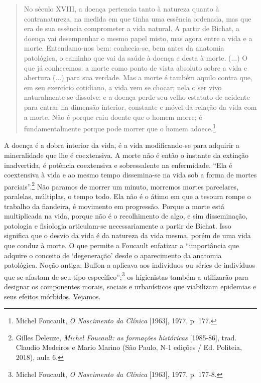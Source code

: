 \begin{quote}
No século XVIII, a doença pertencia tanto à natureza quanto à
contranatureza, na medida em que tinha uma essência ordenada, mas que
era de sua essência comprometer a vida natural. A partir de Bichat, a
doença vai desempenhar o mesmo papel misto, mas agora entre a vida e a
morte. Entendamo-nos bem: conhecia-se, bem antes da anatomia patológica,
o caminho que vai da saúde à doença e desta à morte. (...) O que já
conhecemos: a morte como ponto de vista absoluto sobre a vida e abertura
(...) para sua verdade. Mas a morte é também aquilo contra que, em seu
exercício cotidiano, a vida vem se chocar; nela o ser vivo naturalmente
se dissolve: e a doença perde seu velho estatuto de acidente para entrar
na dimensão interior, constante e móvel da relação da vida com a morte.
Não é porque caiu doente que o homem morre; é fundamentalmente porque
pode morrer que o homem adoece.\footnote{Michel Foucault, \emph{O
  Nascimento da Clínica} {[}1963{]}, 1977, p. 177.}
\end{quote}

A doença é a dobra interior da vida, é a vida modificando-se para
adquirir a mineralidade que lhe é coextensiva. A morte não é então o
instante da extinção inadvertida, é potência coextensiva e sobressalente
na enfermidade. ``Ela é coextensiva à vida e ao mesmo tempo dissemina-se
na vida sob a forma de mortes parciais''.\footnote{Gilles Deleuze,
  \emph{Michel Foucault: as formações históricas} {[}1985-86{]}, trad.
  Claudio Medeiros e Mario Marino (São Paulo, N-1 edições / Ed.
  Politeia, 2018), aula 6.} Não paramos de morrer um minuto, morremos
mortes parcelares, paralelas, múltiplas, o tempo todo. Ela não é o átimo
em que a tesoura rompe o trabalho da fiandeira, é movimento em
progressão. Porque a morte está multiplicada na vida, porque não é o
recolhimento de algo, e sim disseminação, patologia e fisiologia
articulam-se necessariamente a partir de Bichat. Isso significa que o
desvio da vida é da natureza da vida mesma, porém de uma vida que conduz
à morte. O que permite a Foucault enfatizar a ``importância que adquire
o conceito de `degeneração' desde o aparecimento da anatomia patológica.
Noção antiga: Buffon a aplicava aos indivíduos ou séries de indivíduos
que se afastam de seu tipo específico'';\footnote{Michel Foucault,
  \emph{O Nascimento da Clínica} {[}1963{]}, 1977, p. 177-8.} os
higienistas também a utilizarão para designar os componentes morais,
sociais e urbanísticos que viabilizam epidemias e seus efeitos mórbidos.
Vejamos.

